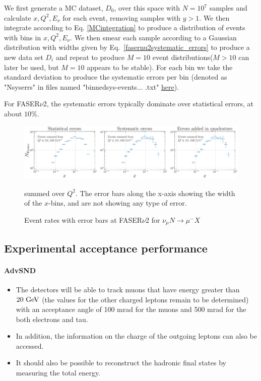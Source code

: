 We first generate a MC dataset, $D_0$, over this space with $N = 10^7$ samples and calculate $x,Q^2,E_{\nu}$ for each event, removing samples with $y > 1$. We then integrate according to Eq. \ref{MCintegration} to produce a distribution of events with bins in $x,Q^2,E_{\nu}$. We then smear each sample according to a Gaussian distribution with widths given by Eq.~\ref{fasernu2systematic_errors} to produce a new data set $D_i$ and repeat to produce $M = 10$ event distributions($M>10$ can later be used, but $M = 10$ appears to be stable). For each bin we take the standard deviation to produce the systematic errors per bin (denoted as "N\textunderscore sys\textunderscore errs" in files named "binned\textunderscore sys-events... .txt" \href{https://github.com/juanrojochacon/FPF-WG1/tree/main/results}{here}). 

For FASER${\nu}$2, the systematic errors typically dominate over statistical errors, at about $10\%$. 

\begin{figure}[h]
    \centering
    \includegraphics[width = 1\textwidth]{plots/error_plot_FASERv2_14.pdf}
    \caption{Event rates with error bars at FASER$\nu$2 for $\nu_{\mu} N \rightarrow \mu^- X$} summed over $Q^2$. The error bars along the x-axis showing the width of the $x$-bins, and are not showing any type of error.
    \label{fig:my_label}
\end{figure}

\subsection{Experimental acceptance performance} 

\paragraph{AdvSND} 
\begin{itemize}
    \item The detectors will be able to track muons that have energy greater
    than $20~\rm{GeV}$ (the values for the other charged leptons remain to be
    determined) with an acceptance angle of 100 mrad for the muons and 
    500 mrad for the both electrons and tau.
    \item In addition, the information on the charge of the outgoing leptons
    can also be accessed.
    \item It should also be possible to reconstruct the hadronic final states
    by measuring the total energy.
\end{itemize}

